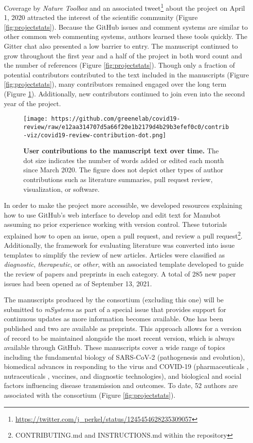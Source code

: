 \documentclass[twocolumn]{ceurart}
\begin{document}
Coverage by \emph{Nature Toolbox} \citep{AE0QcVgJ} and an associated tweet\footnote{\url{https://twitter.com/j_perkel/status/1245454628235309057}} about the project on April 1, 2020 attracted the interest of the scientific community (Figure \ref{fig:projectstats}).
Because the GitHub issues and comment systems are similar to other common web commenting systems, authors learned these tools quickly.
The Gitter chat also presented a low barrier to entry.
The manuscript continued to grow throughout the first year and a half of the project in both word count and the number of references (Figure \ref{fig:projectstats}).
Though only a fraction of potential contributors contributed to the text included in the manuscripts (Figure \ref{fig:projectstats}), many contributors remained engaged over the long term (Figure \ref{fig:projectdots}).
Additionally, new contributors continued to join even into the second year of the project.

\begin{figure}
\hypertarget{fig:projectdots}{%
\centering
\texttt{[image: https://github.com/greenelab/covid19-review/raw/e12aa314707d5a66f20e1b2179d4b29b3efef0c0/contrib-viz/covid19-review-contribution-dot.png]}
\caption{\textbf{User contributions to the manuscript text over time.}
The dot size indicates the number of words added or edited each month since March 2020.
The figure does not depict other types of author contributions such as literature summaries, pull request review, visualization, or software.}\label{fig:projectdots}
}
\end{figure}

In order to make the project more accessible, we developed resources explaining how to use GitHub's web interface to develop and edit text for Manubot assuming no prior experience working with version control.
These tutorials explained how to open an issue, open a pull request, and review a pull request\footnote{CONTRIBUTING.md and INSTRUCTIONS.md within the
  repository}.
Additionally, the framework for evaluating literature was converted into issue templates to simplify the review of new articles.
Articles were classified as \emph{diagnostic}, \emph{therapeutic}, or \emph{other}, with an associated template developed to guide the review of papers and preprints in each category.
A total of 285 new paper issues had been opened as of September 13, 2021.

The manuscripts produced by the consortium (excluding this one) will be submitted to \emph{mSystems} as part of a special issue that provides support for continuous updates as more information becomes available.
One has been published and two are available as preprints.
This approach allows for a version of record to be maintained alongside the most recent version, which is always available through GitHub.
These manuscripts cover a wide range of topics including the fundamental biology of SARS-CoV-2 (pathogenesis \citep{GdZc4Yyd} and evolution), biomedical advances in responding to the virus and COVID-19 (pharmaceuticals \citep{njpLhBui}, nutraceuticals \citep{wgAGKcBj}, vaccines, and diagnostic technologies), and biological and social factors influencing disease transmission and outcomes.
To date, 52 authors are associated with the consortium (Figure \ref{fig:projectstats}).
\end{document}
